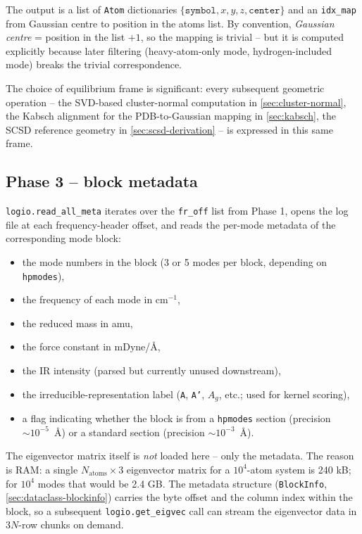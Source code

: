 \documentclass[10pt,a4paper,twoside]{article}
\newcommand{\codref}[1]{%
  \quad\text{\textcolor{gray!70!black}{\footnotesize $\rightsquigarrow$~\texttt{#1}}}}
\newcommand{\fn}[1]{\texttt{#1}}
\begin{document}
The output is a list of \fn{Atom} dictionaries
$\{\texttt{symbol}, x, y, z, \texttt{center}\}$ and an
\fn{idx\_map} from Gaussian centre to position in the atoms list. By
convention, \emph{Gaussian centre} = position in the list $+ 1$, so
the mapping is trivial -- but it is computed explicitly because
later filtering (heavy-atom-only mode, hydrogen-included mode) breaks
the trivial correspondence.

The choice of equilibrium frame is significant: every subsequent
geometric operation -- the SVD-based cluster-normal computation in
\cref{sec:cluster-normal}, the Kabsch alignment for the PDB-to-Gaussian
mapping in \cref{sec:kabsch}, the SCSD reference geometry in
\cref{sec:scsd-derivation} -- is expressed in this same frame.

\subsection{Phase 3 -- block metadata}
\label{sec:phase3-meta}

\codref{logio.read\_all\_meta}

\fn{logio.read\_all\_meta} iterates over the \fn{fr\_off} list from
Phase 1, opens the log file at each frequency-header offset, and reads
the per-mode metadata of the corresponding mode block:

\begin{itemize}
  \item the mode numbers in the block (3 or 5 modes per block,
        depending on \texttt{hpmodes}),
  \item the frequency of each mode in cm$^{-1}$,
  \item the reduced mass in amu,
  \item the force constant in mDyne/\AA{},
  \item the IR intensity (parsed but currently unused downstream),
  \item the irreducible-representation label (\texttt{A}, \texttt{A'},
        $A_g$, etc.; used for kernel scoring),
  \item a flag indicating whether the block is from a \texttt{hpmodes}
        section (precision $\sim 10^{-5}$~\AA) or a standard section
        (precision $\sim 10^{-3}$~\AA).
\end{itemize}

The eigenvector matrix itself is \emph{not} loaded here -- only the
metadata. The reason is RAM: a single $N_\text{atoms} \times 3$
eigenvector matrix for a $10^4$-atom system is 240 kB; for $10^4$
modes that would be 2.4 GB. The metadata structure
(\fn{BlockInfo}, \cref{sec:dataclass-blockinfo}) carries the byte
offset and the column index within the block, so a subsequent
\fn{logio.get\_eigvec} call can stream the eigenvector data in
3$N$-row chunks on demand.
\end{document}
